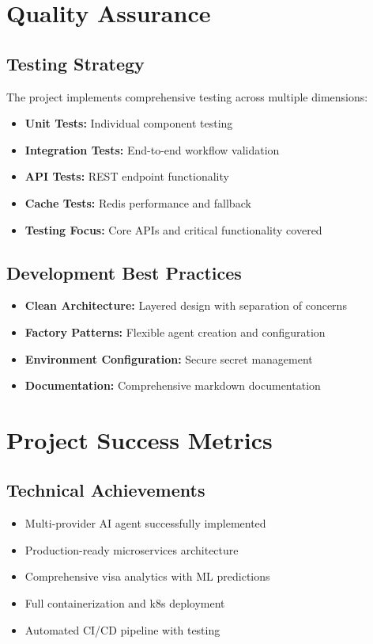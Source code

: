 \documentclass[11pt,a4paper]{article}
\newcommand{\greencheck}{\textcolor{successgreen}{\checkmark}}
\begin{document}
\newpage
\section{Quality Assurance}

\subsection{Testing Strategy}
The project implements comprehensive testing across multiple dimensions:
\begin{itemize}[itemsep=0.3em]
    \item \textbf{Unit Tests:} Individual component testing
    \item \textbf{Integration Tests:} End-to-end workflow validation
    \item \textbf{API Tests:} REST endpoint functionality
    \item \textbf{Cache Tests:} Redis performance and fallback
    \item \textbf{Testing Focus:} Core APIs and critical functionality covered
\end{itemize}

\subsection{Development Best Practices}
\begin{itemize}[itemsep=0.3em]
    \item \textbf{Clean Architecture:} Layered design with separation of concerns
    \item \textbf{Factory Patterns:} Flexible agent creation and configuration
    \item \textbf{Environment Configuration:} Secure secret management
    \item \textbf{Documentation:} Comprehensive markdown documentation
\end{itemize}


\newpage
\section{Project Success Metrics}

\subsection{Technical Achievements}
\begin{itemize}[itemsep=0.3em]
    \item[\greencheck] Multi-provider AI agent successfully implemented
    \item[\greencheck] Production-ready microservices architecture
    \item[\greencheck] Comprehensive visa analytics with ML predictions
    \item[\greencheck] Full containerization and k8s deployment
    \item[\greencheck] Automated CI/CD pipeline with testing
\end{itemize}
\end{document}
